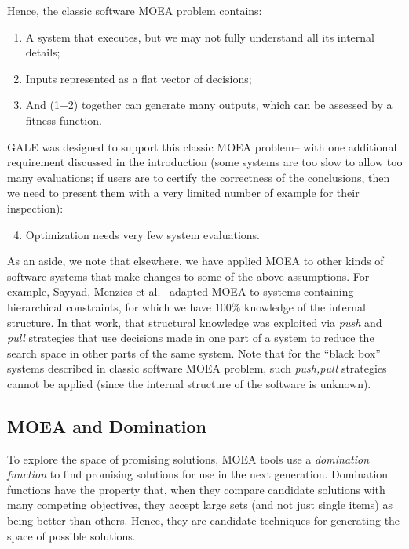 \documentclass[10pt,journal,compsoc]{IEEEtran}
\newcommand{\be}{\begin{enumerate}}
\newcommand{\ee}{\end{enumerate}}
\newenvironment{changed}{\par\color{MyDarkBlue}}{\par}
\begin{document}
\begin{changed}
Hence, the classic software MOEA 
problem contains:\be
\item
 A system that executes, but we may not fully understand all its internal details;
\item
Inputs represented as a flat vector of decisions;
\item And (1+2) together can 
generate many outputs, which can be assessed by a
fitness function.
\ee
GALE was designed to support this
classic MOEA problem-- with one additional requirement
discussed in the introduction (some systems are too
slow to allow too many evaluations; if users are to certify the correctness of the conclusions, then
we need to present them with a very limited number of example for their inspection):
\begin{enumerate}
\setcounter{enumi}{3}
\item Optimization needs very few system evaluations.
\end{enumerate}
As an aside, we note that elsewhere, we have applied MOEA to other kinds of software systems that make changes
to some of the above assumptions. For example, Sayyad, Menzies et al.~\cite{sayyad13a,sayyad13b} 
adapted
MOEA to systems containing hierarchical  constraints, for which we
have  100\% knowledge of the internal structure.
In that work, that structural knowledge was exploited via {\em push} and {\em pull} strategies
that use decisions made in
one part of a system to reduce the search space in
other parts of the same system. Note that for the ``black box'' systems described in classic
software MOEA problem, such {\em push,pull} strategies cannot be applied (since the internal
structure of the software is unknown).
\end{changed}
\subsection{MOEA and Domination}\label{sec:cdom}


To explore the space of promising solutions,
MOEA tools
use a
{\em  domination function} to
find
promising solutions for use in the next generation. 
Domination functions have the property
that, when they compare candidate solutions with many competing objectives,
they accept large sets (and not just single items) as being better than others.
Hence, they are candidate techniques for generating the space of possible solutions.
\end{document}
